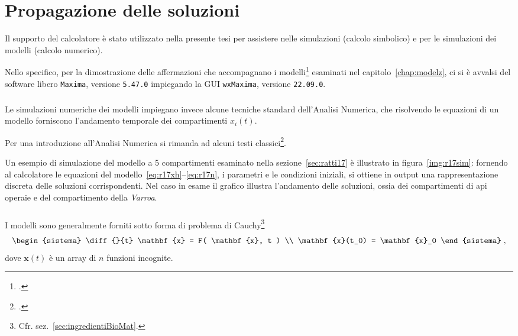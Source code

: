 \chapter{Propagazione delle soluzioni}
Il supporto del calcolatore è stato utilizzato nella presente tesi per assistere nelle simulazioni (calcolo simbolico)
e per le simulazioni dei modelli (calcolo numerico).

Nello specifico, per la dimostrazione delle affermazioni che accompagnano i modelli\footcite{khoury2011,ratti2017}
esaminati nel capitolo~\ref{chap:modelz}, ci si è avvalsi del software libero \texttt{Maxima},
versione \texttt{5.47.0} impiegando la GUI \texttt{wxMaxima}, versione \texttt{22.09.0}.

\paragraph{}
Le simulazioni numeriche dei modelli impiegano invece alcune tecniche standard dell'Analisi Numerica,
che risolvendo le equazioni di un modello forniscono l'andamento temporale dei compartimenti $x_i (t)$.

Per una introduzione all'Analisi Numerica si rimanda ad alcuni testi classici\footcite{ananum,ananumlin,demmel}.

Un esempio di simulazione del modello a 5 compartimenti esaminato nella sezione~\ref{sec:ratti17} è illustrato
in figura~\ref{img:r17sim}: fornendo al calcolatore le equazioni del modello~\eqref{eq:r17xh}--\eqref{eq:r17n},
i parametri e le condizioni iniziali,
si ottiene in output una rappresentazione discreta delle soluzioni corrispondenti.
Nel caso in esame il grafico illustra l'andamento delle soluzioni, ossia dei compartimenti di api operaie e del
compartimento della \emph{Varroa}.

\paragraph{}
I modelli sono generalmente forniti sotto forma di problema di Cauchy\footnote{Cfr. sez.~\ref{sec:ingredientiBioMat}.}
\begin{equation}
\begin{sistema}
\diff{}{t} \mathbf{x} = F( \mathbf{x}, t )  \\
\mathbf{x}(t_0) = \mathbf{x}_0
\end{sistema}
\; ,
\label{eq:probCauchy}
\end{equation}
dove $\mathbf{x}(t)$ è un array di $n$ funzioni incognite.

